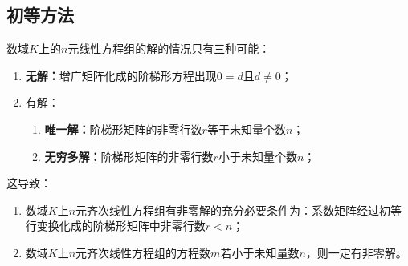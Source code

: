 \subsection{初等方法}
\begin{theorem}\label{theo:SolutionOfSLE1}
	数域$K$上的$n$元线性方程组的解的情况只有三种可能：
	\begin{enumerate}
		\item \textbf{无解：}增广矩阵化成的阶梯形方程出现$0=d$且$d\ne0$；
		\item 有解：
		\begin{enumerate}
			\item \textbf{唯一解：}阶梯形矩阵的非零行数$r$等于未知量个数$n$；
			\item \textbf{无穷多解：}阶梯形矩阵的非零行数$r$小于未知量个数$n$；
		\end{enumerate}
	\end{enumerate}
	这导致：
	\begin{enumerate}
		\item 数域$K$上$n$元齐次线性方程组有非零解的充分必要条件为：系数矩阵经过初等行变换化成的阶梯形矩阵中非零行数$r<n$；
		\item 数域$K$上$n$元齐次线性方程组的方程数$m$若小于未知量数$n$，则一定有非零解。
	\end{enumerate}
\end{theorem}
